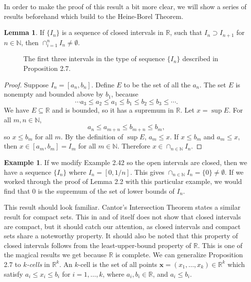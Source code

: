 \documentclass{article}
\newcommand{\N}{\mathbb{N}}
\newcommand{\R}{\mathbb{R}}
\newcommand{\x}{\mathbf{x}}
\theoremstyle{definition}
\newtheorem{lemma}{Lemma}[section]
\newtheorem{example}{Example}[section]
\begin{document}
In order to make the proof of this result a bit more clear, we will show a series of results beforehand which build to the Heine-Borel Theorem.
\begin{lemma}
	If $ \{I_n\} $ is a sequence of closed intervals in $ \R $, such that $ I_n\supset I_{n+1} $  for $ n\in\N $, then $ \cap_{i=1}^n I_n\neq\emptyset$.
\end{lemma}  
		\begin{figure}[h]
	\centering
	\caption{The first three intervals in the type of sequence $ \{I_n\} $ described in Proposition 2.7.}
\end{figure}
\begin{proof}
	Suppose $ I_n=[a_n,b_n] $. Define $ E $ to be the set of all the $ a_n $. The set $ E $ is nonempty and bounded above by $ b_1 $, because $$\cdots a_3\le a_2\le a_1\le b_1\le b_2\le b_3\le \cdots .$$ We have $ E\subseteq \R $ and is bounded, so it has a supremum in $ \R $. Let $ x=\sup E $. For all $ m,n\in\N $, $$a_n\le a_{m+n}\le b_{m+n}\le b_m ,$$ so $ x\le b_m $ for all $ m $. By the definition of $ \sup E $, $ a_m\le x $. If $ x\le b_m $ and $ a_m\le x $, then $ x\in[a_m,b_m]=I_m $ for all $ m\in\N $. Therefore $ x\in\cap_{n\in\N} I_n $.
\end{proof}
\begin{example}
	If we modify Example 2.42 so the open intervals are closed, then we have a sequence $ \{I_n\} $ where $ I_n=[0,1/n] $. This gives $ \cap_{n\in\N} I_n=\{0\}\neq\emptyset $. If we worked through the proof of Lemma 2.2 with this particular example, we would find that $ 0 $ is the supremum of the set of lower bounds of $ I_n $. 
\end{example}
This result should look familiar. Cantor's Intersection Theorem states a similar result for compact sets. This in and of itself does not show that closed intervals are compact, but it should catch our attention, as closed intervals and compact sets share a noteworthy property. It should also be noted that this property of closed intervals follows from the least-upper-bound property of $ \R $. This is one of the magical results we get because $ \R $ is complete.  We can generalize Proposition 2.7 to \textit{\color{red}$ k $-cells} in $ \R^k $. An  $ k $-cell is the set of all points $ \x=(x_1,\ldots,x_k)\in\R^k $ which satisfy $ a_i\le x_i\le b_i $ for $ i=1,\ldots,k $, where $ a_i,b_i\in\R $, and $ a_i\le b_i $. 
\end{document}
